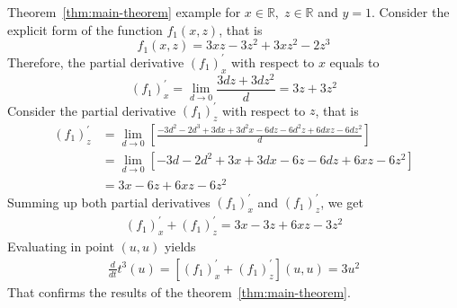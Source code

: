\begin{example}
    \normalfont
    Theorem~\ref{thm:main-theorem} example for $x\in\mathbb{R}, \; z\in \mathbb{R}$ and $y=1$.
    Consider the explicit form of the function $f_{1} (x, z)$, that is
    \[
        f_1(x, z) = 3 x z - 3 z^2 + 3 x z^2 - 2 z^3
    \]
    Therefore, the partial derivative $(f_1)^{'}_{x}$ with respect to $x$ equals to
    \[
        (f_1)^{'}_{x} = \lim_{d \to 0} \frac{3 d z + 3 d z^2}{d} = 3 z + 3 z^2
    \]
    Consider the partial derivative $(f_1) ^{'}_{z}$ with respect to $z$, that is
    \begin{align*}
    (f_1) ^{'}_{z}
        &= \lim_{d \to 0} \left[\frac{-3 d^2 - 2 d^3 + 3 d x + 3 d^2 x - 6 d z - 6 d^2 z + 6 d x z - 6 d z^2}{d} \right] \\
        &= \lim_{d \to 0} \left[ -3 d - 2 d^2 + 3 x + 3 d x - 6 z - 6 d z + 6 x z - 6 z^2 \right] \\
        &=3 x - 6 z + 6 x z - 6 z^2
    \end{align*}
    Summing up both partial derivatives $(f_1)^{'}_{x}$ and $(f_1)^{'}_{z}$, we get
    \begin{align*}
    (f_1)
        ^{'}_{x} + (f_1)^{'}_{z} = 3 x - 3 z + 6 x z - 3 z^2
    \end{align*}
    Evaluating in point $(u, u)$ yields
    \begin{align*}
        \frac{d}{dt} t^{3} (u) = [(f_1)^{'}_{x} + (f_1)^{'}_{z}] (u,u)  = 3 u^2
    \end{align*}
    That confirms the results of the theorem~\ref{thm:main-theorem}.
\end{example}
